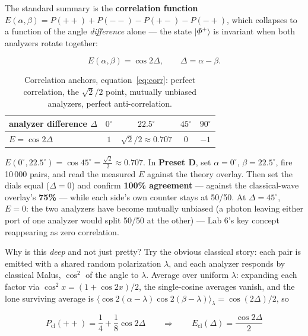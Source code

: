 \documentclass[a4paper,11pt]{article}
\providecommand{\ket}[1]{|#1\rangle}
\begin{document}
The standard summary is the \textbf{correlation function}
$E(\alpha,\beta) = P({+}{+}) + P({-}{-}) - P({+}{-}) - P({-}{+})$, which collapses
to a function of the angle \emph{difference} alone --- the state $\ket{\Phi^{+}}$ is
invariant when both analyzers rotate together:

\begin{equation}
    E(\alpha, \beta) = \cos 2\Delta, \qquad \Delta = \alpha - \beta.
    \label{eq:corr}
\end{equation}

\begin{table}[H]
\centering
\begin{tabular}{lcccc}
\toprule
analyzer difference $\Delta$ & $0^\circ$ & $22.5^\circ$ & $45^\circ$ & $90^\circ$ \\
\midrule
$E = \cos 2\Delta$ & $1$ & $\sqrt{2}/2 \approx 0.707$ & $0$ & $-1$ \\
\bottomrule
\end{tabular}
\caption{Correlation anchors, equation~\eqref{eq:corr}: perfect correlation,
the $\sqrt 2/2$ point, mutually unbiased analyzers, perfect anti-correlation.}
\label{tab:corr}
\end{table}

\begin{numberbox}
$E(0^\circ, 22.5^\circ) = \cos 45^\circ = \tfrac{\sqrt 2}{2} \approx \mathbf{0.707}$.
In \textbf{Preset D}, set $\alpha = 0^\circ$, $\beta = 22.5^\circ$, fire 10\,000
pairs, and read the measured $E$ against the theory overlay. Then set the dials equal
($\Delta = 0$) and confirm \textbf{100\% agreement} --- against the classical-wave
overlay's \textbf{75\%} --- while each side's own counter stays at 50/50. At
$\Delta = 45^\circ$, $E = 0$: the two analyzers have become mutually unbiased (a photon
leaving either port of one analyzer would split 50/50 at the other) ---
Lab 6's key concept reappearing as zero correlation.
\end{numberbox}

Why is this \emph{deep} and not just pretty? Try the obvious classical story: each
pair is emitted with a shared random polarization $\lambda$, and each analyzer
responds by classical Malus, $\cos^2$ of the angle to $\lambda$. Average over
uniform $\lambda$: expanding each factor via $\cos^2 x = (1 + \cos 2x)/2$, the
single-cosine averages vanish, and the lone surviving average is
$\langle \cos 2(\alpha - \lambda)\cos 2(\beta - \lambda)\rangle_\lambda
= \cos(2\Delta)/2$, so

\begin{equation}
    P_{\text{cl}}({+}{+}) = \frac14 + \frac18\cos 2\Delta
    \qquad\Longrightarrow\qquad
    E_{\text{cl}}(\Delta) = \frac{\cos 2\Delta}{2}
    \label{eq:classical}
\end{equation}
\end{document}
